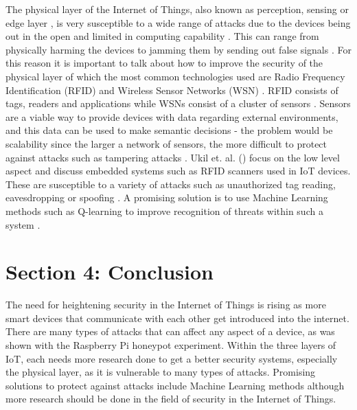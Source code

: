 \documentclass[11pt,a4paper]{article}
\begin{document}
The physical layer of the Internet of Things, also known as perception, sensing or edge layer \cite{1, 7, 11}, is very susceptible to a wide range of attacks due to the devices being out in the open and limited in computing capability \cite{8, 12}. This can range from physically harming the devices to jamming them by sending out false signals \cite{8}. For this reason it is important to talk about how to improve the security of the physical layer of which the most common technologies used are Radio Frequency Identification (RFID) and Wireless Sensor Networks (WSN) \cite{10}.  RFID consists of tags, readers and applications while WSNs consist of a cluster of sensors \cite{8}. Sensors are a viable way to provide devices with data regarding external environments, and this data can be used to make semantic decisions \cite{11} - the problem would be scalability since the larger a network of sensors, the more difficult to protect against attacks such as tampering attacks \cite{8}. Ukil et. al. \cite{12} (\citeyear{12}) focus on the low level aspect and discuss embedded systems such as RFID scanners used in IoT devices. These are susceptible to a variety of attacks such as unauthorized tag reading, eavesdropping or spoofing \cite{8}. A promising solution is to use Machine Learning methods such as Q-learning to improve recognition of threats within such a system \cite{9}.  


\section*{Section 4: Conclusion}

The need for heightening security in the Internet of Things is rising as more smart devices that communicate with each other get introduced into the internet. There are many types of attacks that can affect any aspect of a device, as was shown with the Raspberry Pi honeypot experiment. Within the three layers of IoT, each needs more research done to get a better security systems, especially the physical layer, as it is vulnerable to many types of attacks. Promising solutions to protect against attacks include Machine Learning methods although more research should be done in the field of security in the Internet of Things.


\printbibliography
\end{document}

